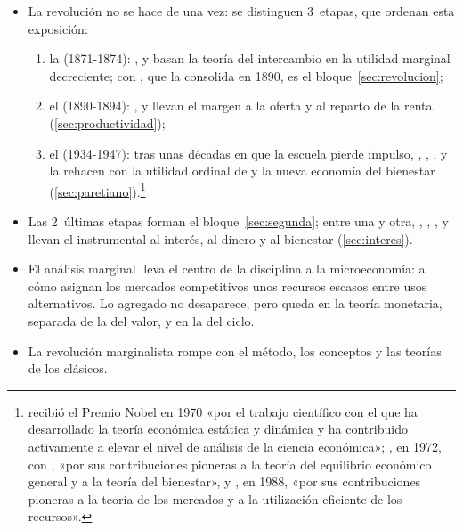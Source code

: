 \documentclass[11pt]{article}
\begin{document}
\begin{itemize}
\begin{itemize}
  \item La revolución no se hace de una vez: se distinguen 3~etapas, que ordenan esta exposición\nocite{Fonseca2026Neoclassicals}:
    \begin{enumerate}
    \item la  (1871-1874): ,  y  basan la teoría del intercambio en la utilidad marginal decreciente; con , que la consolida en 1890, es el bloque~\ref{sec:revolucion};
    \item el  (1890-1894): ,  y  llevan el margen a la oferta y al reparto de la renta (\ref{sec:productividad});
    \item el  (1934-1947): tras unas décadas en que la escuela pierde impulso, , , ,  y  la rehacen con la utilidad ordinal de  y la nueva economía del bienestar (\ref{sec:paretiano}).\footnote{ recibió el Premio Nobel en 1970 «por el trabajo científico con el que ha desarrollado la teoría económica estática y dinámica y ha contribuido activamente a elevar el nivel de análisis de la ciencia económica»\nocite{Nobel1970Samuelson}; , en 1972, con , «por sus contribuciones pioneras a la teoría del equilibrio económico general y a la teoría del bienestar»\nocite{Nobel1972HicksArrow}, y , en 1988, «por sus contribuciones pioneras a la teoría de los mercados y a la utilización eficiente de los recursos»\nocite{Nobel1988Allais}.}
    \end{enumerate}
  \item Las 2~últimas etapas forman el bloque~\ref{sec:segunda}; entre una y otra, , , ,  y  llevan el instrumental al interés, al dinero y al bienestar (\ref{sec:interes}).
  \item El análisis marginal lleva el centro de la disciplina a la microeconomía: a cómo asignan los mercados competitivos unos recursos escasos entre usos alternativos. Lo agregado no desaparece, pero queda en la teoría monetaria, separada de la del valor, y en la del ciclo.
  \item La revolución marginalista rompe con el método, los conceptos y las teorías de los clásicos\nocite{ScrepantiZamagni2005Outline}.

\end{itemize}
\end{itemize}
\end{document}
